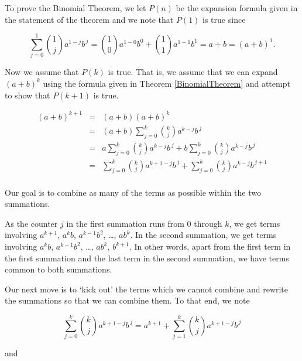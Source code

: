 \medskip

To prove the Binomial Theorem, we let $P(n)$ be the expansion formula given in the statement of the theorem and we note that $P(1)$ is true since


\[ \displaystyle{\sum_{j=0}^{1} \binom{1}{j} a^{1-j} b^{\, j}} =  \displaystyle{\binom{1}{0}a^{1-0}b^{0} +  \binom{1}{1}a^{1-1}b^{1}} = a+b = (a+b)^{1}. \]



Now we assume that $P(k)$ is true.  That is, we assume that we can expand $(a+b)^k$ using the formula given in Theorem \ref{BinomialTheorem}  and attempt to show that $P(k+1)$ is true.

\[ \begin{array}{rcl}

(a+b)^{k+1} & = & (a+b)(a+b)^{k} \\ [15pt]
            & = & (a+b) \displaystyle{\sum_{j=0}^{k} \binom{k}{j} a^{k-j} b^{\, j}}  \\ [15pt]
            & = & a \displaystyle{\sum_{j=0}^{k} \binom{k}{j} a^{k-j} b^{\, j}} +  b \displaystyle{\sum_{j=0}^{k} \binom{k}{j} a^{k-j} b^{\, j}} \\ [15pt]
            & = & \displaystyle{\sum_{j=0}^{k} \binom{k}{j} a^{k+1-j} b^{\, j}} +  \displaystyle{\sum_{j=0}^{k} \binom{k}{j} a^{k-j} b^{\, j+1}} \\ [15pt]           
            
\end{array} \]

Our goal is to combine as many of the terms as possible within the two summations. 

\smallskip

As the counter $j$ in the first summation runs from $0$ through $k$, we get terms involving $a^{k+1}$, $a^{k}b$, $a^{k-1}b^2$, \ldots, $ab^{k}$.   In the second summation,   we get terms involving $a^{k}b$, $a^{k-1}b^{2}$, \ldots, $ab^{k}$, $b^{k+1}$.  In other words, apart from the first term in the first summation and the last term in the second summation, we have terms common to both summations. 

\smallskip

Our next move is to `kick out' the terms which we cannot combine and rewrite the summations so that we can combine them.  To that end, we note

\[ \displaystyle{\sum_{j=0}^{k} \binom{k}{j} a^{k+1-j} b^{\, j} = a^{k+1}+ \sum_{j=1}^{k} \binom{k}{j} a^{k+1-j} b^{\, j}}\]

and

